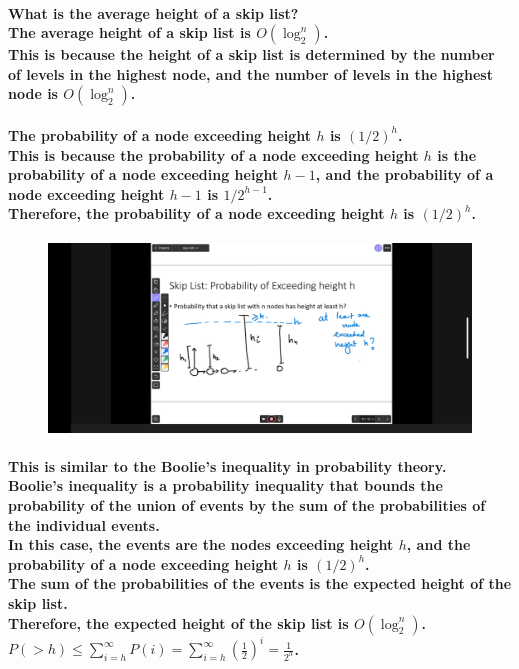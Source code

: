 \documentclass{article}
\begin{document}
\paragraph{
    What is the average height of a skip list?\\
    The average height of a skip list is $O(\log_2^n)$.\\
    This is because the height of a skip list is determined by the number of levels in the highest node, and the number of levels in the highest node is $O(\log_2^n)$.\\
}

\paragraph{
    The probability of a node exceeding height $h$ is $(1/2)^h$.\\
    This is because the probability of a node exceeding height $h$ 
    is the probability of a node exceeding height $h-1$, and the probability 
    of a node exceeding height $h-1$ is $1/2^{h-1}$.\\
    Therefore, the probability of a node exceeding height $h$ is $(1/2)^h$.\\
}

\begin{figure}[H]
    \includegraphics[width=\textwidth]{skiplistheightexceedingh.png}
\end{figure}

\paragraph{
    This is similar to the Boolie's inequality in probability theory.\\
    Boolie's inequality is a probability inequality that bounds the probability 
    of the union of events by the sum of the probabilities of the individual events.\\
    In this case, the events are the nodes exceeding height $h$, and the probability of 
    a node exceeding height $h$ is $(1/2)^h$.\\
    The sum of the probabilities of the events is the expected height of the skip list.\\
    Therefore, the expected height of the skip list is $O(\log_2^n)$.\\
    $P(>h) \leq \sum_{i=h}^{\infty} P(i) = \sum_{i=h}^{\infty} (\frac{1}{2})^i = \frac{1}{2^h}$.\\
}
\end{document}
